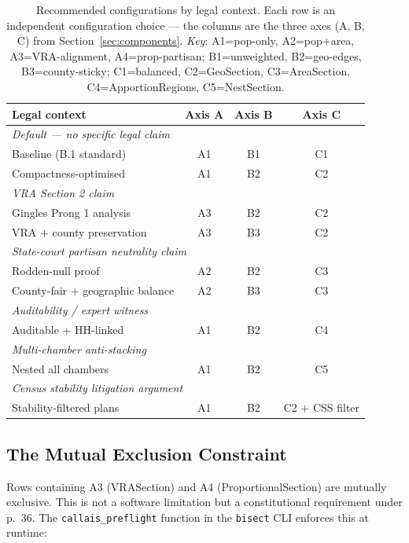 \begin{table}[h]
\centering
\caption{Recommended configurations by legal context.
  Each row is an independent configuration choice --- the columns are the
  three axes (A, B, C) from Section~\ref{sec:components}.
  \textit{Key}: A1=pop-only, A2=pop+area, A3=VRA-alignment, A4=prop-partisan;
  B1=unweighted, B2=geo-edges, B3=county-sticky;
  C1=balanced, C2=GeoSection, C3=AreaSection, C4=ApportionRegions, C5=NestSection.}
\label{tab:configurations}
\begin{tabular}{p{4.5cm}ccc}
\toprule
\textbf{Legal context} & \textbf{Axis A} & \textbf{Axis B} & \textbf{Axis C} \\
\midrule
\multicolumn{4}{l}{\textit{Default --- no specific legal claim}} \\
Baseline (B.1 standard) & A1 & B1 & C1 \\
Compactness-optimised & A1 & B2 & C2 \\[0.5em]
\multicolumn{4}{l}{\textit{VRA Section 2 claim}} \\
Gingles Prong 1 analysis & A3 & B2 & C2 \\
VRA + county preservation & A3 & B3 & C2 \\[0.5em]
\multicolumn{4}{l}{\textit{State-court partisan neutrality claim}} \\
Rodden-null proof & A2 & B2 & C3 \\
County-fair + geographic balance & A2 & B3 & C3 \\[0.5em]
\multicolumn{4}{l}{\textit{Auditability / expert witness}} \\
Auditable + HH-linked & A1 & B2 & C4 \\[0.5em]
\multicolumn{4}{l}{\textit{Multi-chamber anti-stacking}} \\
Nested all chambers & A1 & B2 & C5 \\[0.5em]
\multicolumn{4}{l}{\textit{Census stability litigation argument}} \\
Stability-filtered plans & A1 & B2 & C2 $+$ CSS filter \\
\bottomrule
\end{tabular}
\end{table}

\subsection{The Mutual Exclusion Constraint}

Rows containing A3 (VRASection) and A4 (ProportionalSection) are mutually
exclusive.
This is not a software limitation but a constitutional requirement under
\callais{} p.~36.
The \texttt{callais\_preflight} function in the \texttt{bisect} CLI enforces
this at runtime:

